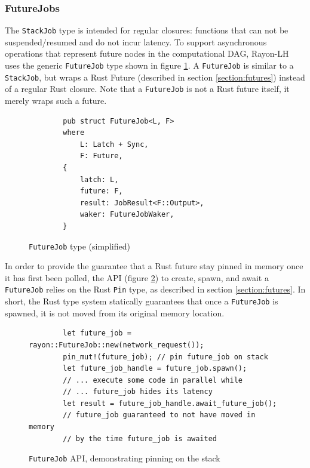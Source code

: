\documentclass[bsc,frontabs,singlespacing,parskip,deptreport,normalheadings]{infthesis}
\begin{document}
\subsubsection*{FutureJobs}
\label{subsubsection:futurejobs}

The \texttt{StackJob} type is intended for regular closures: functions that can
not be suspended/resumed and do not incur latency. To support asynchronous
operations that represent future nodes in the computational DAG, Rayon-LH uses
the generic \texttt{FutureJob} type shown in figure \ref{fig:futurejob}. A
\texttt{FutureJob} is similar to a \texttt{StackJob}, but wraps a Rust Future
(described in section \ref{section:futures}) instead of a regular
Rust closure. Note that a \texttt{FutureJob} is not a Rust future itself, it
merely wraps such a future.

\begin{figure}[ht]
    \begin{verbatim}
        pub struct FutureJob<L, F>
        where
            L: Latch + Sync,
            F: Future,
        {
            latch: L,
            future: F,
            result: JobResult<F::Output>,
            waker: FutureJobWaker,
        }
    \end{verbatim}
    \caption{\texttt{FutureJob} type (simplified)}
    \label{fig:futurejob}
\end{figure}

In order to provide the guarantee that a Rust future stay pinned in memory once
it has first been polled, the API (figure \ref{fig:future_job_api}) to create,
spawn, and await a \texttt{FutureJob} relies on the Rust \texttt{Pin} type, as
described in section \ref{section:futures}. In short, the Rust type
system statically guarantees that once a \texttt{FutureJob} is spawned, it is
not moved from its original memory location.

\begin{figure}[ht]
    \begin{verbatim}
        let future_job = rayon::FutureJob::new(network_request());
        pin_mut!(future_job); // pin future_job on stack
        let future_job_handle = future_job.spawn();
        // ... execute some code in parallel while
        // ... future_job hides its latency
        let result = future_job_handle.await_future_job(); 
        // future_job guaranteed to not have moved in memory
        // by the time future_job is awaited
    \end{verbatim}
    \caption{\texttt{FutureJob} API, demonstrating pinning on the stack}
    \label{fig:future_job_api}
\end{figure}
\end{document}
